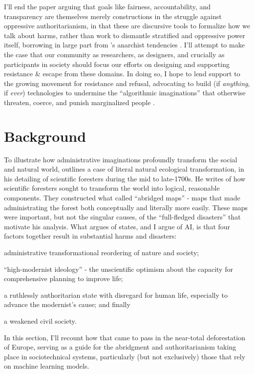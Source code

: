\documentclass[manuscript,screen]{acmart}
\begin{document}
I'll end the paper arguing that goals like fairness, accountability, and transparency are themselves merely constructions in the struggle against oppressive authoritarianism, in that these are discursive tools to formalize how we talk about harms, rather than work to dismantle stratified and oppressive power itself, borrowing in large part from \citeauthor{graeber2015utopia}'s anarchist tendencies
\cite{graeber2015utopia}.
I'll attempt to make the case that our community as researchers, as designers, and crucially as participants in society should focus our efforts on designing and supporting resistance \& escape from these domains.
In doing so, I hope to lend support to the growing movement for resistance and refusal, advocating to build (if \emph{anything}, if \emph{ever}) technologies to undermine the ``algorithmic imaginations'' that otherwise threaten, coerce, and punish marginalized people
\cite{feministManifestNo}.

\section{Background}

To illustrate how administrative imaginations profoundly transform the social and natural world, \citeauthor{scott1998seeing} outlines a case of literal natural ecological transformation, in his detailing of scientific foresters during the mid to late-1700s.
He writes of how scientific foresters sought to transform the world into logical, reasonable components.
They constructed what \citeauthor{scott1998seeing} called ``abridged maps'' - maps that made administrating the forest both conceptually and literally more easily.
These maps were important, but not the singular causes, of the ``full-fledged disasters'' that motivate his analysis.
What \citeauthor{scott1998seeing} argues of states, and I argue of AI, is that four factors together result in substantial harms and disasters: 
\begin{enumerate*}
\item administrative transformational reordering of nature and society;


\item ``high-modernist ideology'' - the unscientific optimism about the capacity for comprehensive planning to improve life;


\item a ruthlessly authoritarian state with disregard for human life, especially to advance the modernist's cause;
and finally 

\item a weakened civil society.
\end{enumerate*}
In this section, I'll recount how that came to pass in the near-total deforestation of Europe, serving as a guide for the abridgment and authoritarianism taking place in sociotechnical systems, particularly (but not exclusively) those that rely on machine learning models.
\end{document}
